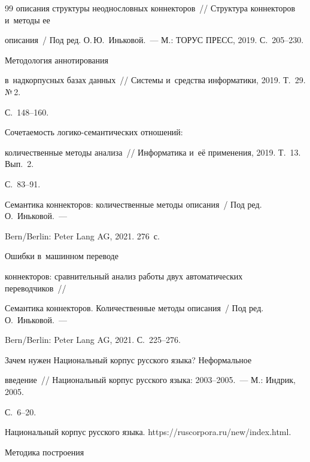 {{\begin{thebibliography}{99}
описания струк\-ту\-ры неоднословных коннекторов~/\!\!/ Структура коннекторов и~методы ее 


описания~/ Под ред. О.\,Ю.~Иньковой.~--- М.: ТОРУС ПРЕСС, 2019. С.~205--230.




 Методология аннотирования 


в~надкорпусных базах данных~/\!\!/ Сис\-те\-мы и~средства информатики, 2019. Т.~29. №\,2. 


С.~148--160.







 Со\-че\-та\-емость ло\-ги\-ко-се\-ман\-ти\-че\-ских отношений: 


количественные методы анализа~/\!\!/ Информатика и~её применения, 2019. Т.~13. Вып.~2. 


С.~83--91.







Семантика коннекторов: количественные методы описания~/ Под ред. О.~Иньковой.~--- 


Bern\!/\!Berlin: Peter Lang AG, 2021. 276~с.




 Ошибки в~машинном переводе 


коннекторов: сравнительный анализ работы двух автоматических переводчиков~/\!\!/ 


Семантика коннекторов. Количественные методы описания~/ Под ред. О.~Иньковой.~--- 


Bern\!/\!Berlin: Peter Lang AG, 2021. С.~225--276.




 Зачем нужен Национальный корпус русского языка? Неформальное 


введение~/\!\!/ Национальный корпус русского языка: 2003--2005.~--- М.: Индрик, 2005.  


С.~6--20.




Национальный корпус русского языка. {\sf https://ruscorpora.ru/new/index.html.}




 Методика по\-стро\-ения 



\end{thebibliography}}}
